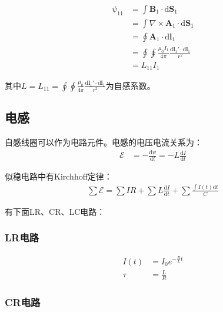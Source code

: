\documentclass[12pt,onecolumn,a4paper]{book}
\numberwithin{table}{subsection}
\numberwithin{equation}{subsection}
\begin{document}
    \begin{align}
        \psi_{11} & = \int \mathbf{B}_1 \cdot \mathrm{d} \mathbf{S}_1                                                       \\
                  & = \int \nabla \times \mathbf{A}_1 \cdot \mathrm{d} \mathbf{S}_1                                         \\
                  & = \oint \mathbf{A}_1 \cdot \mathrm{d} \mathbf{l}_1                                                      \\
                  & = \oint \oint \frac{\mu_0 I_1}{4\pi} \frac{\mathrm{d} \mathbf{l}_1' \cdot \mathrm{d} \mathbf{l}_1}{r^2} \\
                  & = L_{11} I_1
    \end{align}

    其中$L=L_{11} = \oint \oint \frac{\mu_0}{4\pi} \frac{\mathrm{d} \mathbf{l}_1' \cdot \mathrm{d} \mathbf{l}_1}{r^2}$为自感系数。

    \subsection{电感}

    自感线圈可以作为电路元件。电感的电压电流关系为：
    \begin{align}
        \mathcal{E} & = - \frac{\mathrm{d} \psi}{\mathrm{d} t} = - L \frac{\mathrm{d} I}{\mathrm{d} t}
    \end{align}

    似稳电路中有Kirchhoff定律：
    \begin{align}
        \sum \mathcal{E} = \sum IR + \sum L \frac{\mathrm{d} I}{\mathrm{d} t} + \sum \frac{\int I(t) \mathrm{d} t}{C}
    \end{align}

    有下面LR、CR、LC电路：

    \subsubsection{LR电路}

    \begin{align}
        I(t) & = I_0 e^{-\frac{R}{L}t} \\
        \tau & = \frac{L}{R}
    \end{align}

    \subsubsection{CR电路}
\end{document}
